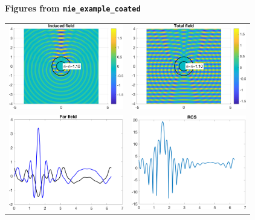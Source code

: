 \documentclass[11pt,letterpaper]{article}
\newcommand{\techheading}[1]{%
    \par\vspace{-0.3\parskip}\noindent\hspace{-1cm}\textbf{#1}%
    \par\vspace{-0.5\parskip}\noindent\nopagebreak\ignorespaces}
\begin{document}
\techheading{Figures from \texttt{mie\_example\_coated}}
\begin{center}
  \begin{tabular}{cc}
    \includegraphics[width=5cm]{mie_example_coated_figure1.png}
    &
    \includegraphics[width=5cm]{mie_example_coated_figure2.png}\\
    \includegraphics[width=5cm]{mie_example_coated_figure3.png}
    &
    \includegraphics[width=5cm]{mie_example_coated_figure4.png}
  \end{tabular}
\end{center}
\end{document}
